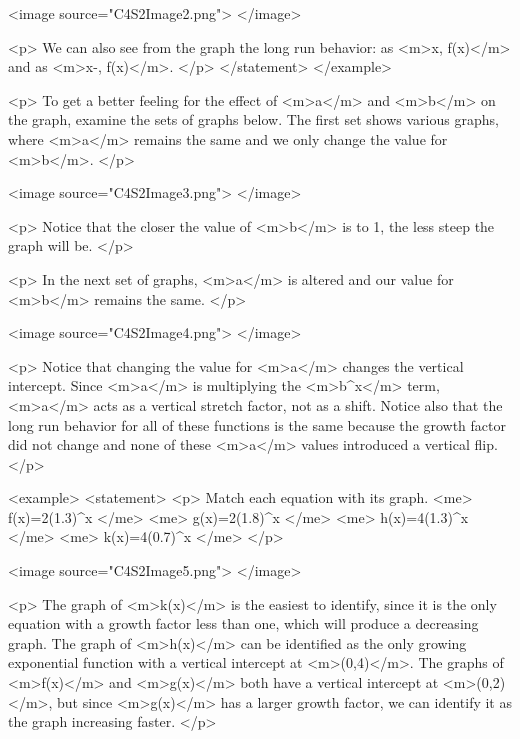                 <image source="C4S2Image2.png">
                </image>

                <p>
                    We can also see from the graph the long run behavior: as <m>x\to\infty, f(x)</m> and as <m>x\to-\infty, f(x)\to \infty</m>.
                </p>
            </statement>
        </example>

        <p>
            To get a better feeling for the effect of <m>a</m> and <m>b</m> on the graph, examine the sets of graphs below.
            The first set shows various graphs, where <m>a</m> remains the same and we only change the value for <m>b</m>.
        </p>

        <image source="C4S2Image3.png">
        </image>

        <p>
            Notice that the closer the value of <m>b</m> is to 1, the less steep the graph will be.
        </p>

        <p>
            In the next set of graphs, <m>a</m> is altered and our value for <m>b</m> remains the same.
        </p>

        <image source="C4S2Image4.png">
        </image>

        <p>
            Notice that changing the value for <m>a</m> changes the vertical intercept.
            Since <m>a</m> is multiplying the <m>b^{x}</m> term, <m>a</m> acts as a vertical stretch factor, not as a shift.
            Notice also that the long run behavior for all of these functions is the same because the growth factor did not change and none of these <m>a</m> values introduced a vertical flip.
        </p>

        <example>
            <statement>
                <p>
                    Match each equation with its graph.
                    <me>
                        f(x)=2(1.3)^{x}
                    </me>
                    <me>
                        g(x)=2(1.8)^{x}
                    </me>
                    <me>
                        h(x)=4(1.3)^{x}
                    </me>
                    <me>
                        k(x)=4(0.7)^{x}
                    </me>
                </p>

                <image source="C4S2Image5.png">
                </image>

                <p>
                    The graph of <m>k(x)</m> is the easiest to identify, since it is the only equation with a growth factor less than one, which will produce a decreasing graph.
                    The graph of <m>h(x)</m> can be identified as the only growing exponential function with a vertical intercept at <m>(0,4)</m>.
                    The graphs of <m>f(x)</m> and <m>g(x)</m> both have a vertical intercept at <m>(0,2)</m>, but since <m>g(x)</m> has a larger growth factor, we can identify it as the graph increasing faster.
                </p>


